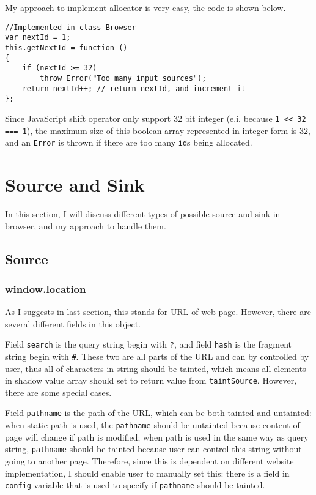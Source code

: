 My approach to implement allocator is very easy, the code is shown below.

\begin{verbatim}
//Implemented in class Browser
var nextId = 1;
this.getNextId = function ()
{
	if (nextId >= 32)
		throw Error("Too many input sources");
	return nextId++; // return nextId, and increment it
};
\end{verbatim}

Since JavaScript shift operator only support 32 bit integer (e.i. because \texttt{1 << 32 === 1}), the maximum size of this boolean array represented in integer form is 32, and an \texttt{Error} is thrown if there are too many \texttt{id}s being allocated. 

\section{Source and Sink}

In this section, I will discuss different types of possible source and sink in browser, and my approach to handle them.

\subsection{Source}

\subsubsection{window.location}

As I suggests in last section, this stands for URL of web page. However, there are several different fields in this object.

Field \texttt{search} is the query string begin with \texttt{?}, and field \texttt{hash} is the fragment string begin with \texttt{#}. These two are all parts of the URL and can by controlled by user, thus all of characters in string should be tainted, which means all elements in shadow value array should set to return value from \texttt{taintSource}. However, there are some special cases. 

Field \texttt{pathname} is the path of the URL, which can be both tainted and untainted: when static path is used, the \texttt{pathname} should be untainted because content of page will change if path is modified; when path is used in the same way as query string, \texttt{pathname} should be tainted because user can control this string without going to another page. Therefore, since this is dependent on different website implementation, I should enable user to manually set this: there is a field in \texttt{config} variable that is used to specify if \texttt{pathname} should be tainted. 


